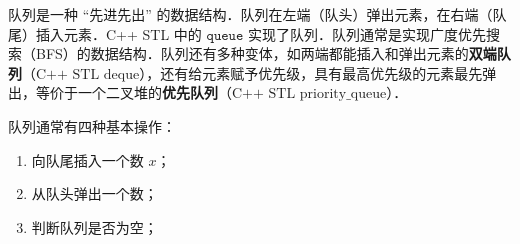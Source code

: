 
队列是一种 “先进先出” 的数据结构．队列在左端（队头）弹出元素，在右端（队尾）插入元素．C++ STL 中的 $\mathtt{queue}$ 实现了队列．队列通常是实现广度优先搜索（BFS）的数据结构．队列还有多种变体，如两端都能插入和弹出元素的\textbf{双端队列}（$\text{C++ STL deque}$），还有给元素赋予优先级，具有最高优先级的元素最先弹出，等价于一个二叉堆的\textbf{优先队列}（$\text{C++ STL priority_queue}$）．

队列通常有四种基本操作：

\begin{enumerate}
\item 向队尾插入一个数 $x$；
\item 从队头弹出一个数；
\item 判断队列是否为空；
\end{enumerate}